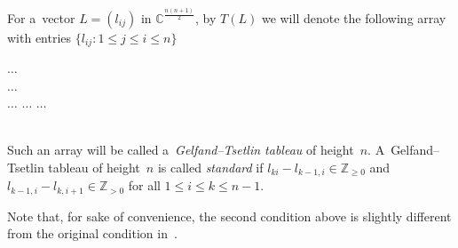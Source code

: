 \begin{Definition}
For a~vector $L=(l_{ij})$ in $\mathbb{C}^{\frac{n(n+1)}{2}}$, by $T(L)$ we will denote the following array with entries
$\{l_{ij}:1\leq j\leq i\leq n\}$

\begin{center}
\hspace{1cm} $\dots$ \hspace{1cm}
\\[0.2pt] \hspace{1.5cm} $\dots$ \hspace{1.5cm} 
\\[0.3cm] \hspace{0.2cm}$\dots$ \hspace{0.8cm} $\dots$ \hspace{0.8cm} $\dots$
\\[0.3cm] 
\\[0.2pt] 
\end{center}
Such an array will be called a~\emph{Gelfand--Tsetlin tableau} of height~$n$.
A~Gelfand--Tsetlin tableau of height~$n$ is called \emph{standard} if $l_{ki}-l_{k-1,i}\in\mathbb{Z}_{\geq 0}$ and
$l_{k-1,i}-l_{k,i+1}\in\mathbb{Z}_{> 0}$ for all $1\leq i\leq k\leq n-1$.
\end{Definition}
Note that, for sake of convenience, the second condition above is slightly dif\/ferent from the original condition
in~\cite{GT}.

